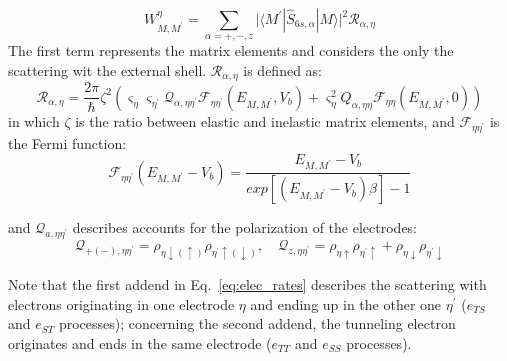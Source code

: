 \documentclass[reprint,amsmath,amssymb,aps,nofootinbib,onecolumn]{revtex4-2}
\begin{document}
\begin{equation}
   W_{M,M^{\prime}}^{\eta}=\sum_{\alpha=+,-,z}    \big|\langle M^{\prime}|\hat{S}_{6s,\alpha}|{M}\rangle \big|^2 \mathcal{R}_{\alpha,\eta}
   \label{eq:elec_rates}
\end{equation}
The first term represents the matrix elements and considers the only the scattering wit  the external shell. $\mathcal{R}_{\alpha,\eta}$ is defined as:
\begin{equation}
    \mathcal{R}_{\alpha,\eta}=\dfrac{2\pi}{\hbar}\zeta^2\left( \varsigma_{\eta} \varsigma_{\eta^{\prime}}\mathcal{Q}_{\alpha,\eta \eta^{\prime}} \mathcal{F}_{\eta \eta^{\prime}}(E_{M,M^{\prime}},V_b)+\varsigma_{\eta}^2{Q}_{\alpha,\eta \eta}\mathcal{F}_{\eta \eta}(E_{M,M^{\prime}},0)\right)
    \label{eq:scatt_rates}
\end{equation}
 in which $\zeta$ is the ratio between elastic and inelastic matrix elements, and $\mathcal{F}_{\eta \eta^{\prime}}$ is the Fermi function:
 \begin{equation}
     \mathcal{F}_{\eta \eta^{\prime}}(E_{M,M^{\prime}}-V_b)=\dfrac{E_{M,M^{\prime}}-V_b}{exp[(E_{M,M^{\prime}}-V_b)\beta]-1}
 \end{equation}
 
 and $\mathcal{Q}_{a,\eta \eta^{\prime}}$ describes accounts for the polarization of the electrodes:
 \begin{equation}
     \mathcal{Q}_{+(-),\eta\eta^{\prime}}=\rho_{\eta\downarrow(\uparrow)}\rho_{\eta^{\prime}\uparrow(\downarrow)}, \quad
     \mathcal{Q}_{z,\eta\eta^{\prime}}=\rho_{\eta\uparrow}\rho_{\eta^{\prime}\uparrow}+\rho_{\eta\downarrow}\rho_{\eta^{\prime}\downarrow}
 \end{equation}
 
 Note that the first addend in Eq.~\ref{eq:elec_rates} describes the scattering with electrons originating in one electrode $\eta$ and ending up in the other one $\eta^{\prime}$ ($e_{TS}$ and $e_{ST}$ processes); concerning the second addend, the tunneling electron originates and ends in the same electrode ($e_{TT}$ and $e_{SS}$ processes).
\end{document}
